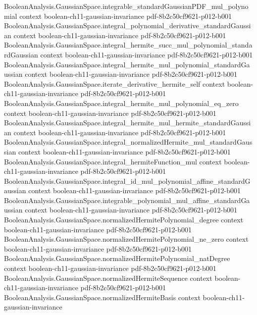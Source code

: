 \begin{theorem}
\proofstep
  {BooleanAnalysis.GaussianSpace.integrable_standardGaussianPDF_mul_polynomial}
  {context}
  {boolean-ch11-gaussian-invariance}
  {pdf-8b2c50cf9621-p012-b001}
\proofstep
  {BooleanAnalysis.GaussianSpace.integral_polynomial_derivative_standardGaussian}
  {context}
  {boolean-ch11-gaussian-invariance}
  {pdf-8b2c50cf9621-p012-b001}
\proofstep
  {BooleanAnalysis.GaussianSpace.integral_hermite_succ_mul_polynomial_standardGaussian}
  {context}
  {boolean-ch11-gaussian-invariance}
  {pdf-8b2c50cf9621-p012-b001}
\proofstep
  {BooleanAnalysis.GaussianSpace.integral_hermite_mul_polynomial_standardGaussian}
  {context}
  {boolean-ch11-gaussian-invariance}
  {pdf-8b2c50cf9621-p012-b001}
\proofstep
  {BooleanAnalysis.GaussianSpace.iterate_derivative_hermite_self}
  {context}
  {boolean-ch11-gaussian-invariance}
  {pdf-8b2c50cf9621-p012-b001}
\proofstep
  {BooleanAnalysis.GaussianSpace.integral_hermite_mul_polynomial_eq_zero}
  {context}
  {boolean-ch11-gaussian-invariance}
  {pdf-8b2c50cf9621-p012-b001}
\proofstep
  {BooleanAnalysis.GaussianSpace.integral_hermite_mul_hermite_standardGaussian}
  {context}
  {boolean-ch11-gaussian-invariance}
  {pdf-8b2c50cf9621-p012-b001}
\proofstep
  {BooleanAnalysis.GaussianSpace.integral_normalizedHermite_mul_standardGaussian}
  {context}
  {boolean-ch11-gaussian-invariance}
  {pdf-8b2c50cf9621-p012-b001}
\proofstep
  {BooleanAnalysis.GaussianSpace.integral_hermiteFunction_mul}
  {context}
  {boolean-ch11-gaussian-invariance}
  {pdf-8b2c50cf9621-p012-b001}
\proofstep
  {BooleanAnalysis.GaussianSpace.integral_id_mul_polynomial_affine_standardGaussian}
  {context}
  {boolean-ch11-gaussian-invariance}
  {pdf-8b2c50cf9621-p012-b001}
\proofstep
  {BooleanAnalysis.GaussianSpace.integrable_polynomial_mul_affine_standardGaussian}
  {context}
  {boolean-ch11-gaussian-invariance}
  {pdf-8b2c50cf9621-p012-b001}
\proofstep
  {BooleanAnalysis.GaussianSpace.normalizedHermitePolynomial_degree}
  {context}
  {boolean-ch11-gaussian-invariance}
  {pdf-8b2c50cf9621-p012-b001}
\proofstep
  {BooleanAnalysis.GaussianSpace.normalizedHermitePolynomial_ne_zero}
  {context}
  {boolean-ch11-gaussian-invariance}
  {pdf-8b2c50cf9621-p012-b001}
\proofstep
  {BooleanAnalysis.GaussianSpace.normalizedHermitePolynomial_natDegree}
  {context}
  {boolean-ch11-gaussian-invariance}
  {pdf-8b2c50cf9621-p012-b001}
\proofstep
  {BooleanAnalysis.GaussianSpace.normalizedHermiteSequence}
  {context}
  {boolean-ch11-gaussian-invariance}
  {pdf-8b2c50cf9621-p012-b001}
\proofstep
  {BooleanAnalysis.GaussianSpace.normalizedHermiteBasis}
  {context}
  {boolean-ch11-gaussian-invariance}

\end{theorem}
